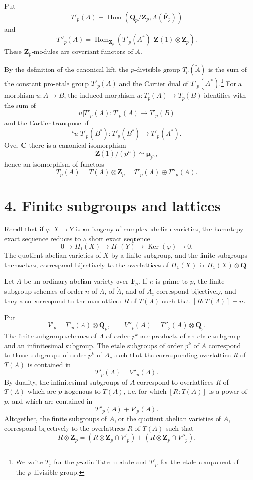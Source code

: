 \documentclass[10pt]{amsart}
\theoremstyle{plain}
\theoremstyle{remark}
\DeclareMathOperator{\Ker}{Ker}
\DeclareMathOperator{\Hom}{Hom}
\begin{document}
Put
\[
T'_p(A)=\Hom(\mathbf Q_p/\mathbf Z_p,A(\overline{\mathbf F}_p))
\]
and
\[
T''_p(A)=\Hom_{\mathbf Z_p}(T'_p(A^*),\mathbf Z(1)\otimes \mathbf Z_p).
\]
These $\mathbf Z_p$-modules are covariant functors of $A$.

By the definition of the canonical lift, the $p$-divisible group $T_p(\widetilde A)$ is the sum of the constant pro-etale group $T'_p(A)$ and the Cartier dual of $T'_p(A^*)$.\footnote{We write $T_p$ for the $p$-adic Tate module and $T'_p$ for the etale component of the $p$-divisible group.} For a morphism $u:A\to B$, the induced morphism $u:T_p(A)\to T_p(B)$ identifies with the sum of
\[
u|T'_p(A):T'_p(A)\to T'_p(B)
\]
and the Cartier transpose of
\[
{}^t u|T'_p(B^*):T'_p(B^*)\to T'_p(A^*).
\]
Over $\mathbf C$ there is a canonical isomorphism
\[
\mathbf Z(1)/(p^n)\simeq \boldsymbol\mu_{p^n},
\]
hence an isomorphism of functors
\begin{equation}\label{eq:3.3}
T_p(A)=T(A)\otimes \mathbf Z_p=T'_p(A)\oplus T''_p(A).
\end{equation}

\section*{4. Finite subgroups and lattices}
Recall that if $\varphi:X\to Y$ is an isogeny of complex abelian varieties, the homotopy exact sequence reduces to a short exact sequence
\[
0\to H_1(X)\to H_1(Y)\to \Ker(\varphi)\to 0.
\]
The quotient abelian varieties of $X$ by a finite subgroup, and the finite subgroups themselves, correspond bijectively to the overlattices of $H_1(X)$ in $H_1(X)\otimes \mathbf Q$.

Let $A$ be an ordinary abelian variety over $\overline{\mathbf F}_p$. If $n$ is prime to $p$, the finite subgroup schemes of order $n$ of $A$, of $\widetilde A$, and of $A_c$ correspond bijectively, and they also correspond to the overlattices $R$ of $T(A)$ such that $[R:T(A)]=n$.

Put
\[
V'_p=T'_p(A)\otimes \mathbf Q_p,
\qquad
V''_p(A)=T''_p(A)\otimes \mathbf Q_p.
\]
The finite subgroup schemes of $A$ of order $p^k$ are products of an etale subgroup and an infinitesimal subgroup. The etale subgroups of order $p^k$ of $A$ correspond to those subgroups of order $p^k$ of $A_c$ such that the corresponding overlattice $R$ of $T(A)$ is contained in
\[
T'_p(A)+V''_p(A).
\]
By duality, the infinitesimal subgroups of $A$ correspond to overlattices $R$ of $T(A)$ which are $p$-isogenous to $T(A)$, i.e. for which $[R:T(A)]$ is a power of $p$, and which are contained in
\[
T''_p(A)+V'_p(A).
\]
Altogether, the finite subgroups of $A$, or the quotient abelian varieties of $A$, correspond bijectively to the overlattices $R$ of $T(A)$ such that
\begin{equation}\label{eq:4.1}
R\otimes \mathbf Z_p=(R\otimes \mathbf Z_p\cap V'_p)+(R\otimes \mathbf Z_p\cap V''_p).
\end{equation}
\end{document}
